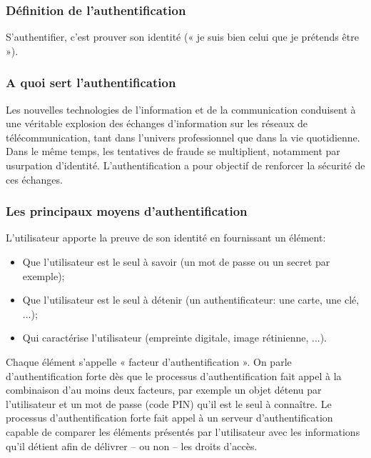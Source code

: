 \subsubsection{Définition de l’authentification}
S’authentifier, c’est prouver son identité (« je suis bien celui que je prétends être »).

\subsubsection{A quoi sert l’authentification}
Les nouvelles technologies de l’information et de la communication conduisent à une véritable explosion des échanges d’information sur les réseaux de télécommunication, tant dans l’univers professionnel que dans la vie quotidienne. Dans le même temps, les tentatives de fraude se multiplient, notamment par usurpation d’identité. L’authentification a pour objectif de renforcer la sécurité de ces échanges.
\newpage
\subsubsection{Les principaux moyens d’authentification}
L’utilisateur apporte la preuve de son identité en fournissant un élément:\\

\begin{itemize}
\item Que l’utilisateur est le seul à savoir (un mot de passe ou un secret par exemple);
\item Que l’utilisateur est le seul à détenir (un authentificateur: une carte, une clé, ...);
\item Qui caractérise l’utilisateur (empreinte digitale, image rétinienne, ...).\\
\end{itemize}

Chaque élément s’appelle « facteur d’authentification ». On parle d’authentification forte dès que le processus d’authentification fait appel à la combinaison d’au moins deux facteurs, par exemple un objet détenu par l’utilisateur et un mot de passe (code PIN) qu’il est le seul à connaître. Le processus d’authentification forte fait appel à un serveur d’authentification capable de comparer les éléments présentés par l’utilisateur avec les informations qu’il détient afin de délivrer – ou non – les droits d’accès.

